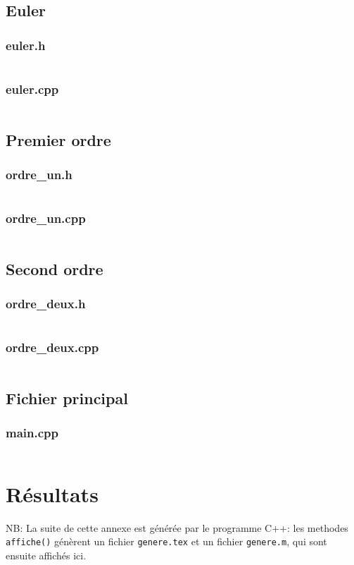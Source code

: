 \documentclass{report}
\begin{document}
\section{Euler}
\subsection{euler.h}
\inputminted[linenos,fontsize=\scriptsize]{c++}{../src/euler.h}
\subsection{euler.cpp}
\inputminted[linenos,fontsize=\scriptsize]{c++}{../src/euler.cpp}

\section{Premier ordre}
\subsection{ordre\_un.h}
\inputminted[linenos,fontsize=\scriptsize]{c++}{../src/ordre_un.h}
\subsection{ordre\_un.cpp}
\inputminted[linenos,fontsize=\scriptsize]{c++}{../src/ordre_un.cpp}

\section{Second ordre}
\subsection{ordre\_deux.h}
\inputminted[linenos,fontsize=\scriptsize]{c++}{../src/ordre_deux.h}
\subsection{ordre\_deux.cpp}
\inputminted[linenos,fontsize=\scriptsize]{c++}{../src/ordre_deux.cpp}

\section{Fichier principal}
\subsection{main.cpp}
\inputminted[linenos,fontsize=\scriptsize]{c++}{../src/main.cpp}


\chapter{Résultats}
NB: La suite de cette annexe est générée par le programme C++: les methodes \verb|affiche()| génèrent
un fichier \verb|genere.tex| et un fichier \verb|genere.m|, qui sont ensuite affichés ici.


\end{document}
